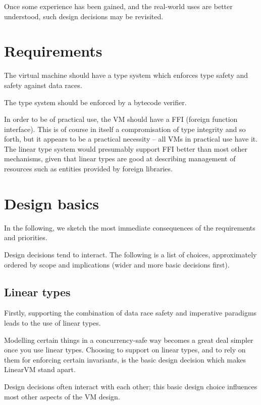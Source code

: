 \documentclass[a4paper]{book}
\begin{document}
Once some experience has been gained, and the real-world uses are
better understood, such design decisions may be revisited.


\section{Requirements}
The virtual machine should have a type system which
enforces type safety and safety against data races.

The type system should be enforced by a bytecode verifier.

In order to be of practical use, the VM should have a FFI (foreign
function interface).  This is of course in itself a compromisation of
type integrity and so forth, but it appears to be a practical necessity
-- all VMs
in practical use have it.  The linear type system would presumably
support FFI better than most other mechanisms, given that linear types are good at
describing management of resources such as entities provided by
foreign libraries.

\section{Design basics}

In the following, we sketch the most immediate consequences of the
requirements and priorities.

Design decisions tend to interact.
The following is a list of choices, approximately ordered by scope and
implications (wider and more basic decisions first).

\subsection{Linear types}
Firstly, supporting the combination of data race safety and imperative
paradigms leads to the use of linear types.

Modelling certain things in a concurrency-safe way becomes a great deal simpler
once you use linear types.
Choosing to support on linear types, and to rely on them for enforcing
certain invariants, is the basic design decision which makes LinearVM
stand apart.

Design decisions often interact with each other; this basic design choice
influences most other aspects of the VM design.
\end{document}
